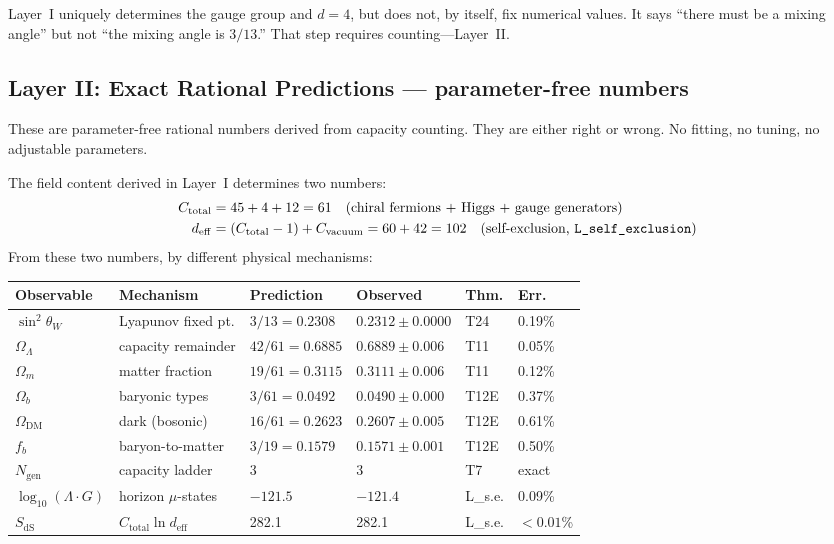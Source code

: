 \documentclass[11pt]{article}
\begin{document}
Layer~I uniquely determines the gauge group and $d=4$, but does not, by itself, fix numerical values.  It says ``there must be a mixing angle'' but not ``the mixing angle is $3/13$.''  That step requires counting---Layer~II.


\subsection{Layer II: Exact Rational Predictions --- parameter-free numbers}

These are parameter-free rational numbers derived from capacity counting.  They are either right or wrong.  No fitting, no tuning, no adjustable parameters.

The field content derived in Layer~I determines two numbers:
\begin{align}
C_{\mathrm{total}} &= 45 + 4 + 12 = 61 \quad\text{(chiral fermions + Higgs + gauge generators)} \\
d_{\mathrm{eff}} &= (C_{\mathrm{total}} - 1) + C_{\mathrm{vacuum}} = 60 + 42 = 102 \quad\text{(self-exclusion, \texttt{L\_self\_exclusion})}
\end{align}
From these two numbers, by different physical mechanisms:

\smallskip
\begin{center}
\small
\begin{tabular}{p{2cm}p{3.2cm}p{2.5cm}p{2.5cm}p{0.8cm}p{1cm}}
\toprule
\textbf{Observable} & \textbf{Mechanism} & \textbf{Prediction} & \textbf{Observed} & \textbf{Thm.} & \textbf{Err.} \\
\midrule
$\sin^2\!\theta_W$ & Lyapunov fixed pt. & $3/13 = 0.2308$ & $0.2312 \pm 0.0000$ & T24 & 0.19\% \\
$\Omega_\Lambda$ & capacity remainder & $42/61 = 0.6885$ & $0.6889 \pm 0.006$ & T11 & 0.05\% \\
$\Omega_m$ & matter fraction & $19/61 = 0.3115$ & $0.3111 \pm 0.006$ & T11 & 0.12\% \\
$\Omega_b$ & baryonic types & $3/61 = 0.0492$ & $0.0490 \pm 0.000$ & T12E & 0.37\% \\
$\Omega_{\mathrm{DM}}$ & dark (bosonic) & $16/61 = 0.2623$ & $0.2607 \pm 0.005$ & T12E & 0.61\% \\
$f_b$ & baryon-to-matter & $3/19 = 0.1579$ & $0.1571 \pm 0.001$ & T12E & 0.50\% \\
$N_{\mathrm{gen}}$ & capacity ladder & 3 & 3 & T7 & exact \\
$\log_{10}(\Lambda\!\cdot\! G)$ & horizon $\mu$-states & $-121.5$ & $-121.4$ & L\_s.e. & 0.09\% \\
$S_{\mathrm{dS}}$ & $C_{\mathrm{total}}\ln d_{\mathrm{eff}}$ & 282.1 & 282.1 & L\_s.e. & ${<}0.01$\% \\
\bottomrule
\end{tabular}
\end{center}
\smallskip
\end{document}
